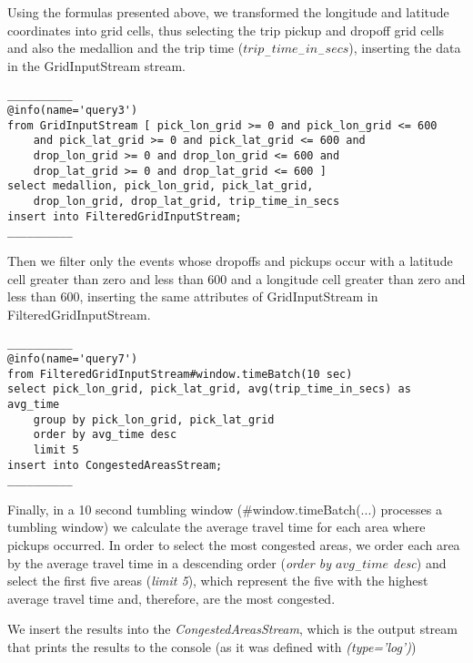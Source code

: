 Using the formulas presented above, we transformed the longitude and latitude coordinates into grid cells, thus selecting the trip pickup and dropoff grid cells and also the medallion and the trip time (\textit{$trip_-time_-in_-secs$}), inserting the data in the GridInputStream stream.

\begin{lstlisting}
__________
@info(name='query3')
from GridInputStream [ pick_lon_grid >= 0 and pick_lon_grid <= 600 
	and pick_lat_grid >= 0 and pick_lat_grid <= 600 and 
	drop_lon_grid >= 0 and drop_lon_grid <= 600 and 
	drop_lat_grid >= 0 and drop_lat_grid <= 600 ]
select medallion, pick_lon_grid, pick_lat_grid, 
	drop_lon_grid, drop_lat_grid, trip_time_in_secs
insert into FilteredGridInputStream;
__________
\end{lstlisting}

Then we filter only the events whose dropoffs and pickups occur with a latitude cell greater than zero and less than 600 and a longitude cell greater than zero and less than 600, inserting the same attributes of GridInputStream in FilteredGridInputStream.\par

\begin{lstlisting}
__________
@info(name='query7')
from FilteredGridInputStream#window.timeBatch(10 sec)
select pick_lon_grid, pick_lat_grid, avg(trip_time_in_secs) as avg_time
    group by pick_lon_grid, pick_lat_grid
    order by avg_time desc
    limit 5
insert into CongestedAreasStream;
__________
\end{lstlisting}

Finally, in a 10 second tumbling window (\#window.timeBatch(...) processes a tumbling window) we calculate the average travel time for each area where pickups occurred. In order to select the most congested areas, we order each area by the average travel time in a descending order (\textit{order by $avg_-time$ desc}) and select the first five areas (\textit{limit 5}), which represent the five with the highest average travel time and, therefore, are the most congested.\par
We insert the results into the \textit{CongestedAreasStream}, which is the output stream that prints the results to the console (as it was defined with \textit{\@sink(type='log')}) 